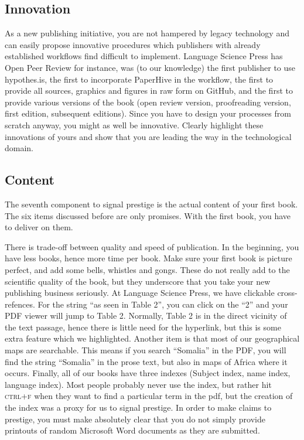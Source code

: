 \documentclass[nonflat,modfonts,output=book] {langsci/langscibook}
\begin{document}
\subsection{Innovation}
As a new publishing initiative, you are not hampered by legacy technology and can easily propose innovative procedures which publishers with already established workflows find difficult to implement. Language Science Press has Open Peer Review for instance, was (to our knowledge) the first publisher to use hypothes.is, the first to incorporate PaperHive in the workflow, the first to provide all sources, graphics and figures in raw form on GitHub, and the first to provide various versions of the book (open review version, proofreading version, first edition, subsequent editions). Since you have to design your processes from scratch anyway, you might as well be innovative. Clearly highlight these innovations of yours and show that you are leading the way in the technological domain. 

 

\subsection{Content}
The seventh component to signal prestige is the actual content of your first book. The six items discussed before are only promises. With the first book, you have to deliver on them. 

There is trade-off between quality and speed of publication. In the beginning, you have less books, hence more time per book. Make sure your first book is picture perfect, and add some bells, whistles and gongs. These do not really add to the scientific quality of the book, but they underscore that you take your new publishing business seriously. At Language Science Press, we have clickable cross-refences. For the string ``as seen in Table 2'', you can click on the ``2'' and your PDF viewer will jump to Table 2. Normally, Table 2 is in the direct vicinity of the text passage, hence there is little need for the hyperlink, but this is some extra feature which we highlighted. Another item is that most of our geographical maps are searchable. This means if you search ``Somalia'' in the PDF, you will find the string ``Somalia'' in the prose text, but also in maps of Africa where it occurs. Finally, all of our books have three indexes (Subject index, name index, language index). Most people probably never use the index,  but rather hit \textsc{ctrl+f} when they want to find a particular term in the pdf, but the creation of the index was a proxy for us to signal prestige. In order to make claims to prestige, you must make absolutely clear that you do not simply provide printouts of random Microsoft Word documents as they are submitted. 
\end{document}
